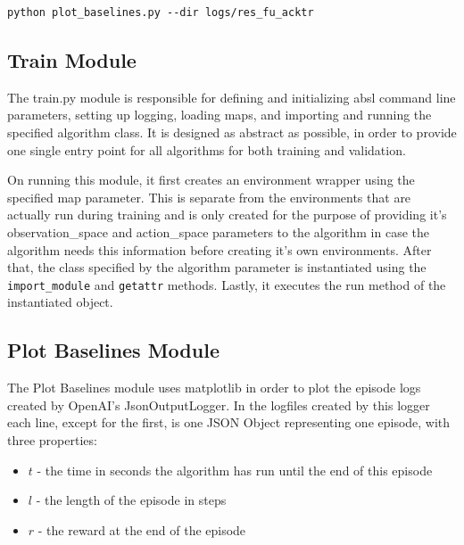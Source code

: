 \begin{lstlisting}
python plot_baselines.py --dir logs/res_fu_acktr
\end{lstlisting}

\subsection{Train Module}
The train.py module is responsible for defining and initializing absl command line parameters, setting up logging, loading maps, and importing and running the specified algorithm class. It is designed as abstract as possible, in order to provide one single entry point for all algorithms for both training and validation. 

On running this module, it first creates an environment wrapper using the specified map parameter. This is separate from the environments that are actually run during training and is only created for the purpose of providing it's observation\_space and action\_space parameters to the algorithm in case the algorithm needs this information before creating it's own environments. After that, the class specified by the algorithm parameter is instantiated using the \lstinline{import_module} and \lstinline{getattr} methods. Lastly, it executes the run method of the instantiated object.


\subsection{Plot Baselines Module}
\label{sec:plotbase}
The Plot Baselines module uses matplotlib in order to plot the episode logs created by OpenAI's JsonOutputLogger. In the logfiles created by this logger each line, except for the first, is one JSON Object representing one episode, with three  properties:
\begin{itemize}
\item $t$ - the time in seconds the algorithm has run until the end of this episode
\item $l$ - the length of the episode in steps
\item $r$ - the reward at the end of the episode
\end{itemize}

